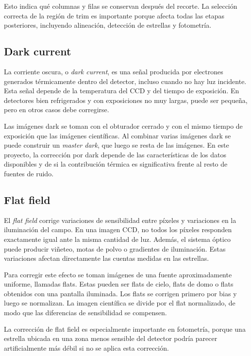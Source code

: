 \documentclass[12pt,letterpaper]{article}
\begin{document}
Esto indica qué columnas y filas se conservan después del recorte. La selección correcta de la región de trim es importante porque afecta todas las etapas posteriores, incluyendo alineación, detección de estrellas y fotometría.

\subsection{Dark current}

La corriente oscura, o \textit{dark current}, es una señal producida por electrones generados térmicamente dentro del detector, incluso cuando no hay luz incidente. Esta señal depende de la temperatura del CCD y del tiempo de exposición. En detectores bien refrigerados y con exposiciones no muy largas, puede ser pequeña, pero en otros casos debe corregirse.

Las imágenes dark se toman con el obturador cerrado y con el mismo tiempo de exposición que las imágenes científicas. Al combinar varias imágenes dark se puede construir un \textit{master dark}, que luego se resta de las imágenes. En este proyecto, la corrección por dark depende de las características de los datos disponibles y de si la contribución térmica es significativa frente al resto de fuentes de ruido.

\subsection{Flat field}

El \textit{flat field} corrige variaciones de sensibilidad entre píxeles y variaciones en la iluminación del campo. En una imagen CCD, no todos los píxeles responden exactamente igual ante la misma cantidad de luz. Además, el sistema óptico puede producir viñeteo, motas de polvo o gradientes de iluminación. Estas variaciones afectan directamente las cuentas medidas en las estrellas.

Para corregir este efecto se toman imágenes de una fuente aproximadamente uniforme, llamadas flats. Estas pueden ser flats de cielo, flats de domo o flats obtenidos con una pantalla iluminada. Los flats se corrigen primero por bias y luego se normalizan. La imagen científica se divide por el flat normalizado, de modo que las diferencias de sensibilidad se compensen.

La corrección de flat field es especialmente importante en fotometría, porque una estrella ubicada en una zona menos sensible del detector podría parecer artificialmente más débil si no se aplica esta corrección.
\end{document}
